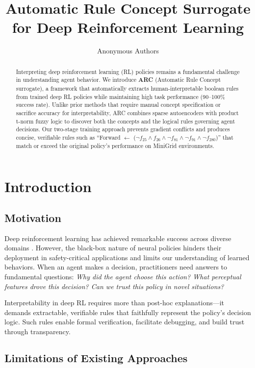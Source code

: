\documentclass[11pt,twocolumn]{article}
\title{\textbf{Automatic Rule Concept Surrogate for Deep Reinforcement Learning}}
\author{Anonymous Authors}
\date{}
\begin{document}
\maketitle

\begin{abstract}
Interpreting deep reinforcement learning (RL) policies remains a fundamental challenge in understanding agent behavior. We introduce \textbf{ARC} (Automatic Rule Concept surrogate), a framework that automatically extracts human-interpretable boolean rules from trained deep RL policies while maintaining high task performance (90--100\% success rate). Unlike prior methods that require manual concept specification or sacrifice accuracy for interpretability, ARC combines sparse autoencoders with product t-norm fuzzy logic to discover both the concepts and the logical rules governing agent decisions. Our two-stage training approach prevents gradient conflicts and produces concise, verifiable rules such as ``Forward $\leftarrow$ ($\neg f_{25} \land f_{26} \land \neg f_{81} \land \neg f_{91} \land \neg f_{280}$)'' that match or exceed the original policy's performance on MiniGrid environments.
\end{abstract}

\section{Introduction}

\subsection{Motivation}

Deep reinforcement learning has achieved remarkable success across diverse domains \cite{silver2016alphago,mnih2015human}. However, the black-box nature of neural policies hinders their deployment in safety-critical applications and limits our understanding of learned behaviors. When an agent makes a decision, practitioners need answers to fundamental questions: \emph{Why did the agent choose this action? What perceptual features drove this decision? Can we trust this policy in novel situations?}

Interpretability in deep RL requires more than post-hoc explanations—it demands extractable, verifiable rules that faithfully represent the policy's decision logic. Such rules enable formal verification, facilitate debugging, and build trust through transparency.

\subsection{Limitations of Existing Approaches}
\end{document}
